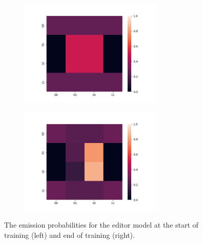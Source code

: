 \documentclass[11pt]{article}
\begin{document}
\begin{figure}[h]
\centering
\begin{subfigure}[t]{0.45\textwidth}
\centering
\includegraphics[height=2in]{../plots/editor_init.png}
\end{subfigure}
\begin{subfigure}[t]{0.45\textwidth}
\centering
\includegraphics[height=2in]{../plots/editor_final.png}
\end{subfigure}
\caption{
\label{fig:editor-toy}
The emission probabilities for the editor model at the start of training (left)
and end of training (right).
}
\end{figure}
\end{document}
